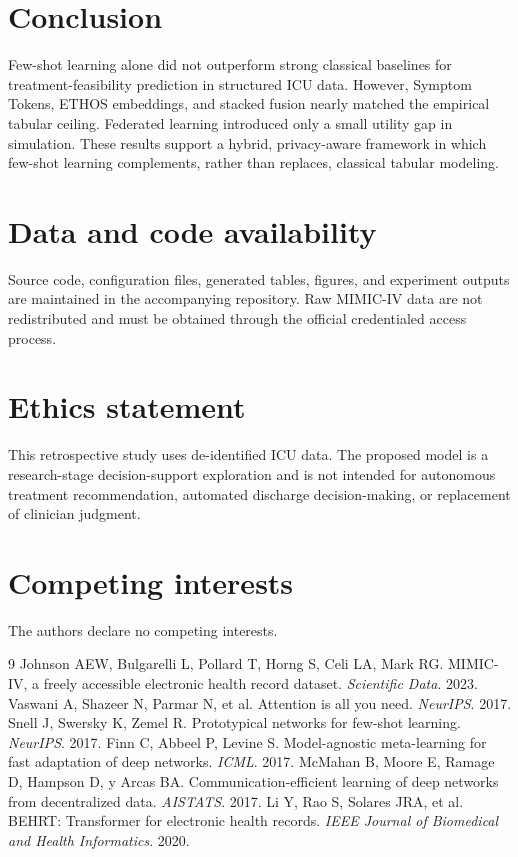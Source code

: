 \documentclass[11pt]{article}
\newcommand{\modelname}{ETHOS}
\begin{document}
\section{Conclusion}
Few-shot learning alone did not outperform strong classical baselines for treatment-feasibility prediction in structured ICU data. However, Symptom Tokens, \modelname{} embeddings, and stacked fusion nearly matched the empirical tabular ceiling. Federated learning introduced only a small utility gap in simulation. These results support a hybrid, privacy-aware framework in which few-shot learning complements, rather than replaces, classical tabular modeling.

\section*{Data and code availability}
Source code, configuration files, generated tables, figures, and experiment outputs are maintained in the accompanying repository. Raw MIMIC-IV data are not redistributed and must be obtained through the official credentialed access process.

\section*{Ethics statement}
This retrospective study uses de-identified ICU data. The proposed model is a research-stage decision-support exploration and is not intended for autonomous treatment recommendation, automated discharge decision-making, or replacement of clinician judgment.

\section*{Competing interests}
The authors declare no competing interests.

\begin{thebibliography}{9}
 Johnson AEW, Bulgarelli L, Pollard T, Horng S, Celi LA, Mark RG. MIMIC-IV, a freely accessible electronic health record dataset. \emph{Scientific Data}. 2023.
 Vaswani A, Shazeer N, Parmar N, et al. Attention is all you need. \emph{NeurIPS}. 2017.
 Snell J, Swersky K, Zemel R. Prototypical networks for few-shot learning. \emph{NeurIPS}. 2017.
 Finn C, Abbeel P, Levine S. Model-agnostic meta-learning for fast adaptation of deep networks. \emph{ICML}. 2017.
 McMahan B, Moore E, Ramage D, Hampson D, y Arcas BA. Communication-efficient learning of deep networks from decentralized data. \emph{AISTATS}. 2017.
 Li Y, Rao S, Solares JRA, et al. BEHRT: Transformer for electronic health records. \emph{IEEE Journal of Biomedical and Health Informatics}. 2020.
\end{thebibliography}
\end{document}
